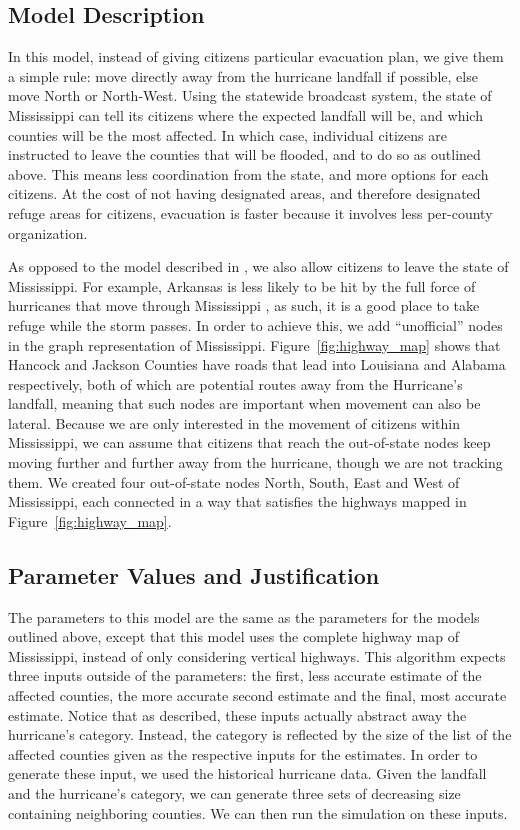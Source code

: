 \documentclass[titlepage]{article}
\begin{document}
  \subsection{Model Description}
    \par In this model, instead of giving citizens particular evacuation plan, we give them a simple rule: move directly away from the hurricane landfall if possible, else move North or North-West. Using the statewide broadcast system, the state of Mississippi can tell its citizens where the expected landfall will be, and which counties will be the most affected. In which case, individual citizens are instructed to leave the counties that will be flooded, and to do so as outlined above. This means less coordination from the state, and more options for each citizens. At the cost of not having designated areas, and therefore designated refuge areas for citizens, evacuation is faster because it involves less per-county organization.\\
    \par As opposed to the model described in , we also allow citizens to leave the state of Mississippi. For example, Arkansas is less likely to be hit by the full force of hurricanes that move through Mississippi \cite{5news}, as such, it is a good place to take refuge while the storm passes. In order to achieve this, we add ``unofficial'' nodes in the graph representation of Mississippi. Figure~\ref{fig:highway_map} shows that Hancock and Jackson Counties have roads that lead into Louisiana and Alabama respectively, both of which are potential routes away from the Hurricane's landfall, meaning that such nodes are important when movement can also be lateral. Because we are only interested in the movement of citizens within Mississippi, we can assume that citizens that reach the out-of-state nodes keep moving further and further away from the hurricane, though we are not tracking them. We created four out-of-state nodes North, South, East and West of Mississippi, each connected in a way that satisfies the highways mapped in Figure~\ref{fig:highway_map}.
  \subsection{Parameter Values and Justification}
    \par The parameters to this model are the same as the parameters for the models outlined above, except that this model uses the complete highway map of Mississippi, instead of only considering vertical highways. This algorithm expects three inputs outside of the parameters: the first, less accurate estimate of the affected counties, the more accurate second estimate and the final, most accurate estimate. Notice that as described, these inputs actually abstract away the hurricane's category. Instead, the category is reflected by the size of the list of the affected counties given as the respective inputs for the estimates. In order to generate these input, we used the historical hurricane data. Given the landfall and the hurricane's category, we can generate three sets of decreasing size containing neighboring counties. We can then run the simulation on these inputs.
\end{document}
